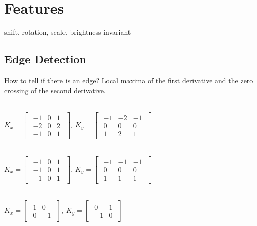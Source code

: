 \section{Features}
 shift, rotation, scale, brightness invariant
\subsection*{Edge Detection}
How to tell if there is an edge? Local maxima of the first derivative and the zero crossing of the second derivative.\\

\\
$K_x = \begin{bmatrix}
    \begin{smallmatrix}
        -1 & 0 & 1\\
        -2 & 0 & 2\\
        -1 & 0 & 1
    \end{smallmatrix}
\end{bmatrix}$,
$K_y = \begin{bmatrix}
    \begin{smallmatrix}
        -1 & -2 & -1\\
        0 & 0 & 0\\
        1 & 2 & 1
    \end{smallmatrix}
\end{bmatrix}$

\\
$K_x = \begin{bmatrix}
    \begin{smallmatrix}
        -1 & 0 & 1\\
        -1 & 0 & 1\\
        -1 & 0 & 1
    \end{smallmatrix}
\end{bmatrix}$,
$K_y = \begin{bmatrix}
    \begin{smallmatrix}
        -1 & -1 & -1\\
        0 & 0 & 0\\
        1 & 1 & 1
    \end{smallmatrix}
\end{bmatrix}$

\\
$K_x = \begin{bmatrix}
    \begin{smallmatrix}
        1 & 0\\
        0 & -1
    \end{smallmatrix}
\end{bmatrix}$,
$K_y = \begin{bmatrix}
    \begin{smallmatrix}
        0 & 1\\
        -1 & 0
    \end{smallmatrix}
\end{bmatrix}$

